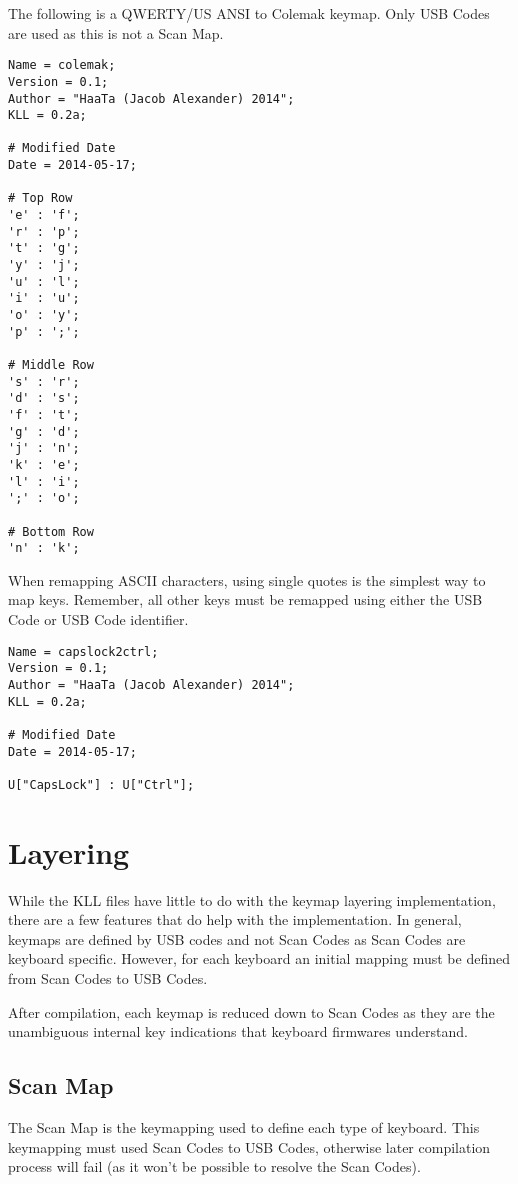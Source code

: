 \documentclass{kiibohd-template}
\begin{document}
The following is a QWERTY/US ANSI to Colemak keymap.
Only USB Codes are used as this is not a Scan Map.

\begin{lstlisting}
Name = colemak;
Version = 0.1;
Author = "HaaTa (Jacob Alexander) 2014"; 
KLL = 0.2a;

# Modified Date
Date = 2014-05-17;

# Top Row
'e' : 'f';
'r' : 'p';
't' : 'g';
'y' : 'j';
'u' : 'l';
'i' : 'u';
'o' : 'y';
'p' : ';';

# Middle Row
's' : 'r';
'd' : 's';
'f' : 't';
'g' : 'd';
'j' : 'n';
'k' : 'e';
'l' : 'i';
';' : 'o';

# Bottom Row
'n' : 'k';
\end{lstlisting}

When remapping ASCII characters, using single quotes is the simplest way to map keys.
Remember, all other keys must be remapped using either the USB Code or USB Code identifier.

\begin{lstlisting}
Name = capslock2ctrl;
Version = 0.1;
Author = "HaaTa (Jacob Alexander) 2014"; 
KLL = 0.2a;

# Modified Date
Date = 2014-05-17;

U["CapsLock"] : U["Ctrl"];
\end{lstlisting}


\chapter{Layering}

While the KLL files have little to do with the keymap layering implementation, there are a few features that do help with the implementation.
In general, keymaps are defined by USB codes and not Scan Codes as Scan Codes are keyboard specific.
However, for each keyboard an initial mapping must be defined from Scan Codes to USB Codes.

After compilation, each keymap is reduced down to Scan Codes as they are the unambiguous internal key indications that keyboard firmwares understand.


\section{Scan Map}

The Scan Map is the keymapping used to define each type of keyboard.
This keymapping must used Scan Codes to USB Codes, otherwise later compilation process will fail (as it won't be possible to resolve the Scan Codes).
\end{document}
